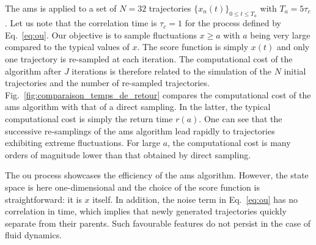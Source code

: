 	
	The \ac{ams} is applied  to a set of $N=32$ trajectories $\{x_n(t)\}_{0\leq t \leq T_a}$ with $T_a=5\tau_c$.
	Let us note that the correlation time is $\tau_c = 1$ for the process defined by Eq.~\eqref{eq:ou}.
	Our objective is to sample fluctuations $x\geq a$ with $a$ being very large compared to the typical values of $x$.
	The score function is simply $x(t)$ and only one trajectory is re-sampled at each iteration.
	The computational cost of the algorithm after $J$ iterations is therefore related to the simulation of the $N$ initial trajectories and the number of re-sampled trajectories.
	Fig.~\ref{fig:comparaison_temps_de_retour} compares the computational cost of the \ac{ams} algorithm with that of a direct sampling. 
	In the latter, the typical computational cost is simply the return time $r(a)$.
	One can see that the successive re-samplings of the \ac{ams} algorithm lead rapidly to trajectories exhibiting extreme fluctuations.
	For large $a$, the computational cost is many orders of magnitude lower than that obtained by direct sampling.
	
	The \acl{ou} process showcases the efficiency of the \ac{ams} algorithm.
	However, the state space is here one-dimensional and the choice of the score function is straightforward: it is $x$ itself.
	In addition, the noise term in Eq.~\eqref{eq:ou} has no correlation in time, which implies that newly generated trajectories quickly separate from their parents. Such favourable features do not persist in the case of fluid dynamics.